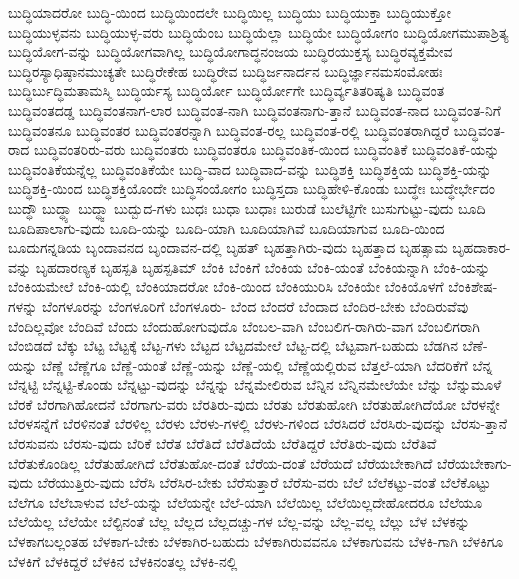 {ಬುದ್ಧಿಯಾದರೋ
ಬುದ್ಧಿ-ಯಿಂದ
ಬುದ್ಧಿಯಿಂದಲೇ
ಬುದ್ಧಿಯಿಲ್ಲ
ಬುದ್ಧಿಯು
ಬುದ್ಧಿಯುಕ್ತಾ
ಬುದ್ಧಿಯುಕ್ತೋ
ಬುದ್ಧಿಯುಳ್ಳವನು
ಬುದ್ಧಿಯುಳ್ಳ-ವರು
ಬುದ್ಧಿಯೆಂಬ
ಬುದ್ಧಿಯೆಲ್ಲಾ
ಬುದ್ಧಿಯೇ
ಬುದ್ಧಿಯೋಗಂ
ಬುದ್ಧಿಯೋಗಮುಪಾಶ್ರಿತ್ಯ
ಬುದ್ಧಿಯೋಗ-ವನ್ನು
ಬುದ್ಧಿಯೋಗವಾಗಿಲ್ಲ
ಬುದ್ಧಿಯೋಗಾದ್ಧನಂಜಯ
ಬುದ್ಧಿರಯುಕ್ತಸ್ಯ
ಬುದ್ಧಿರವ್ಯಕ್ತಮೇವ
ಬುದ್ಧಿರಸ್ಯಾಧಿಷ್ಠಾನಮುಚ್ಯತೇ
ಬುದ್ಧಿರೇಕೇಹ
ಬುದ್ಧಿರೇವ
ಬುದ್ಧಿರ್ಜನಾರ್ದನ
ಬುದ್ಧಿರ್ಜ್ಞಾನಮಸಂಮೋಹಃ
ಬುದ್ಧಿರ್ಬುದ್ಧಿಮತಾಮಸ್ಮಿ
ಬುದ್ಧಿರ್ಯಸ್ಯ
ಬುದ್ಧಿರ್ಯೋ
ಬುದ್ಧಿರ್ಯೋಗೇ
ಬುದ್ಧಿರ್ವ್ಯತಿತರಿಷ್ಯತಿ
ಬುದ್ಧಿವಂತ
ಬುದ್ಧಿವಂತದಡ್ಡ
ಬುದ್ಧಿವಂತನಾಗ-ಲಾರ
ಬುದ್ಧಿವಂತ-ನಾಗಿ
ಬುದ್ಧಿವಂತನಾಗು-ತ್ತಾನೆ
ಬುದ್ಧಿವಂತ-ನಾದ
ಬುದ್ಧಿವಂತ-ನಿಗೆ
ಬುದ್ಧಿವಂತನೂ
ಬುದ್ಧಿವಂತರ
ಬುದ್ಧಿವಂತರನ್ನಾಗಿ
ಬುದ್ಧಿವಂತ-ರಲ್ಲ
ಬುದ್ಧಿವಂತ-ರಲ್ಲಿ
ಬುದ್ಧಿವಂತರಾಗಿದ್ದರೆ
ಬುದ್ಧಿವಂತ-ರಾದ
ಬುದ್ಧಿವಂತರಿರು-ವರು
ಬುದ್ಧಿವಂತರು
ಬುದ್ಧಿವಂತರೂ
ಬುದ್ಧಿವಂತಿಕ-ಯಿಂದ
ಬುದ್ಧಿವಂತಿಕೆ
ಬುದ್ಧಿವಂತಿಕೆ-ಯನ್ನು
ಬುದ್ಧಿವಂತಿಕೆಯನ್ನೆಲ್ಲ
ಬುದ್ಧಿವಂತಿಕೆಯೇ
ಬುದ್ಧಿ-ವಾದ
ಬುದ್ಧಿವಾದ-ವನ್ನು
ಬುದ್ಧಿಶಕ್ತಿ
ಬುದ್ಧಿಶಕ್ತಿಯ
ಬುದ್ಧಿಶಕ್ತಿ-ಯನ್ನು
ಬುದ್ಧಿಶಕ್ತಿ-ಯಿಂದ
ಬುದ್ಧಿಶಕ್ತಿಯೊಂದೇ
ಬುದ್ಧಿಸಂಯೋಗಂ
ಬುದ್ಧಿಸ್ತದಾ
ಬುದ್ಧಿಹೇಳಿ-ಕೊಂಡು
ಬುದ್ಧೇಃ
ಬುದ್ಧೇರ್ಭೇದಂ
ಬುದ್ಧೌ
ಬುದ್ಧ್ಯಾ
ಬುದ್ಧ್ವಾ
ಬುದ್ಬುದ-ಗಳು
ಬುಧಃ
ಬುಧಾ
ಬುಧಾಃ
ಬುರುಡೆ
ಬುಲೆಟ್ಟಿಗೇ
ಬುಸುಗುಟ್ಟು-ವುದು
ಬೂದಿ
ಬೂದಿಪಾಲಾಗು-ವುದು
ಬೂದಿ-ಯನ್ನು
ಬೂದಿ-ಯಾಗಿ
ಬೂದಿಯಾಗಿವೆ
ಬೂದಿಯಾಗುವ
ಬೂದಿ-ಯಿಂದ
ಬೂದುಗನ್ನಡಿಯ
ಬೃಂದಾವನದ
ಬೃಂದಾವನ-ದಲ್ಲಿ
ಬೃಹತ್
ಬೃಹತ್ತಾಗಿರು-ವುದು
ಬೃಹತ್ತಾದ
ಬೃಹತ್ಸಾಮ
ಬೃಹದಾಕಾರ-ವನ್ನು
ಬೃಹದಾರಣ್ಯಕ
ಬೃಹಸ್ಪತಿ
ಬೃಹಸ್ಪತಿಮ್
ಬೆಂಕಿ
ಬೆಂಕಿಗೆ
ಬೆಂಕಿಯ
ಬೆಂಕಿ-ಯಂತೆ
ಬೆಂಕಿಯನ್ನಾಗಿ
ಬೆಂಕಿ-ಯನ್ನು
ಬೆಂಕಿಯಮೇಲೆ
ಬೆಂಕಿ-ಯಲ್ಲಿ
ಬೆಂಕಿಯಾದರೋ
ಬೆಂಕಿ-ಯಿಂದ
ಬೆಂಕಿಯುರಿಸಿ
ಬೆಂಕಿಯೇ
ಬೆಂಕಿಯೊಳಗೆ
ಬೆಂಕಿಶೇಷ-ಗಳನ್ನು
ಬೆಂಗಳೂರನ್ನು
ಬೆಂಗಳೂರಿಗೆ
ಬೆಂಗಳೂರು-
ಬೆಂದ
ಬೆಂದರೆ
ಬೆಂದಾದ
ಬೆಂದಿರ-ಬೇಕು
ಬೆಂದಿರುವೆವು
ಬೆಂದಿಲ್ಲವೋ
ಬೆಂದಿವೆ
ಬೆಂದು
ಬೆಂದುಹೋಗುವುದೊ
ಬೆಂಬಲ-ವಾಗಿ
ಬೆಂಬಲಿಗ-ರಾಗಿರು-ವಾಗ
ಬೆಂಬಲಿಗರಾಗಿ
ಬೆಂಬಿಡದೆ
ಬೆಕ್ಕು
ಬೆಟ್ಟ
ಬೆಟ್ಟಕ್ಕೆ
ಬೆಟ್ಟ-ಗಳು
ಬೆಟ್ಟದ
ಬೆಟ್ಟದಮೇಲೆ
ಬೆಟ್ಟ-ದಲ್ಲಿ
ಬೆಟ್ಟವಾಗ-ಬಹುದು
ಬೆಡಗಿನ
ಬೆಣೆ-ಯನ್ನು
ಬೆಣ್ಣೆ
ಬೆಣ್ಣೆಗೂ
ಬೆಣ್ಣೆ-ಯಂತೆ
ಬೆಣ್ಣೆ-ಯನ್ನು
ಬೆಣ್ಣೆ-ಯಲ್ಲಿ
ಬೆಣ್ಣೆಯಲ್ಲಿರುವ
ಬೆತ್ತಲೆ-ಯಾಗಿ
ಬೆದರಿಕೆಗೆ
ಬೆನ್ನ
ಬೆನ್ನಟ್ಟಿ
ಬೆನ್ನಟ್ಟಿ-ಕೊಂಡು
ಬೆನ್ನಟ್ಟು-ವುದನ್ನು
ಬೆನ್ನನ್ನು
ಬೆನ್ನಮೇಲಿರುವ
ಬೆನ್ನಿನ
ಬೆನ್ನಿನಮೇಲೆಯೇ
ಬೆನ್ನು
ಬೆನ್ನುಮೂಳೆ
ಬೆರಕೆ
ಬೆರಗಾಗಿಹೋದನೆ
ಬೆರಗಾಗು-ವರು
ಬೆರತಿರು-ವುದು
ಬೆರತು
ಬೆರತುಹೋಗಿ
ಬೆರತುಹೋಗಿದೆಯೋ
ಬೆರಳನ್ನೇ
ಬೆರಳಸನ್ನೆಗೆ
ಬೆರಳಿನಂತೆ
ಬೆರಳಿಲ್ಲ
ಬೆರಳು
ಬೆರಳು-ಗಳಲ್ಲಿ
ಬೆರಳು-ಗಳಿಂದ
ಬೆರಸಿದರೆ
ಬೆರಸಿರು-ವುದನ್ನು
ಬೆರಸು-ತ್ತಾನೆ
ಬೆರಸುವನು
ಬೆರಸು-ವುದು
ಬೆರಿಕೆ
ಬೆರೆತ
ಬೆರೆತಿದೆ
ಬೆರೆತಿದೆಯೆ
ಬೆರೆತಿದ್ದರೆ
ಬೆರೆತಿರು-ವುದು
ಬೆರೆತಿವೆ
ಬೆರೆತುಕೊಂಡಿಲ್ಲ
ಬೆರೆತುಹೋಗಿದೆ
ಬೆರೆತುಹೋ-ದಂತೆ
ಬೆರೆಯ-ದಂತೆ
ಬೆರೆಯದೆ
ಬೆರೆಯಬೇಕಾಗಿದೆ
ಬೆರೆಯಬೇಕಾಗು-ವುದು
ಬೆರೆಯುತ್ತಿರು-ವುದು
ಬೆರೆಸಿ
ಬೆರೆಸಿರ-ಬೇಕು
ಬೆರೆಸುತ್ತಾರೆ
ಬೆರೆಸು-ವರು
ಬೆಲೆ
ಬೆಲೆಕಟ್ಟು-ವಂತೆ
ಬೆಲೆಕೊಟ್ಟು
ಬೆಲೆಗೂ
ಬೆಲೆಬಾಳುವ
ಬೆಲೆ-ಯನ್ನು
ಬೆಲೆಯನ್ನೇ
ಬೆಲೆ-ಯಾಗಿ
ಬೆಲೆಯಿಲ್ಲ
ಬೆಲೆಯಿಲ್ಲದೇಹೋದರೂ
ಬೆಲೆಯೂ
ಬೆಲೆಯೆಲ್ಲ
ಬೆಲೆಯೇ
ಬೆಲ್ಟಿನಂತೆ
ಬೆಲ್ಲ
ಬೆಲ್ಲದ
ಬೆಲ್ಲದಚ್ಚು-ಗಳ
ಬೆಲ್ಲ-ವನ್ನು
ಬೆಲ್ಲ-ವಲ್ಲ
ಬೆಲ್ಲು
ಬೆಳ
ಬೆಳಕನ್ನು
ಬೆಳಕಾಗಬಲ್ಲಂತಹ
ಬೆಳಕಾಗ-ಬೇಕು
ಬೆಳಕಾಗಿರ-ಬಹುದು
ಬೆಳಕಾಗಿರುವವನೂ
ಬೆಳಕಾಗುವನು
ಬೆಳಕಿ-ಗಾಗಿ
ಬೆಳಕಿಗೂ
ಬೆಳಕಿಗೆ
ಬೆಳಕಿದ್ದರೆ
ಬೆಳಕಿನ
ಬೆಳಕಿನಂತಲ್ಲ
ಬೆಳಕಿ-ನಲ್ಲಿ
}
